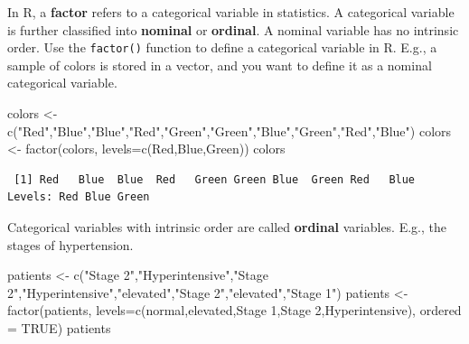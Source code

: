 \documentclass[
  letterpaper,
  DIV=11,
  numbers=noendperiod]{scrreprt}
\newenvironment{Shaded}{\begin{snugshade}}{\end{snugshade}}
\newcommand{\AttributeTok}[1]{\textcolor[rgb]{0.40,0.45,0.13}{#1}}
\newcommand{\ConstantTok}[1]{\textcolor[rgb]{0.56,0.35,0.01}{#1}}
\newcommand{\FunctionTok}[1]{\textcolor[rgb]{0.28,0.35,0.67}{#1}}
\newcommand{\NormalTok}[1]{\textcolor[rgb]{0.00,0.23,0.31}{#1}}
\newcommand{\OtherTok}[1]{\textcolor[rgb]{0.00,0.23,0.31}{#1}}
\newcommand{\StringTok}[1]{\textcolor[rgb]{0.13,0.47,0.30}{#1}}
\begin{document}
In R, a \textbf{factor} refers to a categorical variable in statistics.
A categorical variable is further classified into \textbf{nominal} or
\textbf{ordinal}. A nominal variable has no intrinsic order. Use the
\texttt{factor()} function to define a categorical variable in R. E.g.,
a sample of colors is stored in a vector, and you want to define it as a
nominal categorical variable.

\begin{Shaded}
\begin{Highlighting}[]
\NormalTok{colors }\OtherTok{\textless{}{-}} \FunctionTok{c}\NormalTok{(}\StringTok{"Red"}\NormalTok{,}\StringTok{"Blue"}\NormalTok{,}\StringTok{"Blue"}\NormalTok{,}\StringTok{"Red"}\NormalTok{,}\StringTok{"Green"}\NormalTok{,}\StringTok{"Green"}\NormalTok{,}\StringTok{"Blue"}\NormalTok{,}\StringTok{"Green"}\NormalTok{,}\StringTok{"Red"}\NormalTok{,}\StringTok{"Blue"}\NormalTok{)}
\NormalTok{colors }\OtherTok{\textless{}{-}} \FunctionTok{factor}\NormalTok{(colors, }\AttributeTok{levels=}\FunctionTok{c}\NormalTok{(}\StringTok{\textquotesingle{}Red\textquotesingle{}}\NormalTok{,}\StringTok{\textquotesingle{}Blue\textquotesingle{}}\NormalTok{,}\StringTok{\textquotesingle{}Green\textquotesingle{}}\NormalTok{))}
\NormalTok{colors}
\end{Highlighting}
\end{Shaded}

\begin{verbatim}
 [1] Red   Blue  Blue  Red   Green Green Blue  Green Red   Blue 
Levels: Red Blue Green
\end{verbatim}

Categorical variables with intrinsic order are called \textbf{ordinal}
variables. E.g., the stages of hypertension.

\begin{Shaded}
\begin{Highlighting}[]
\NormalTok{patients }\OtherTok{\textless{}{-}} \FunctionTok{c}\NormalTok{(}\StringTok{"Stage 2"}\NormalTok{,}\StringTok{"Hyperintensive"}\NormalTok{,}\StringTok{"Stage 2"}\NormalTok{,}\StringTok{"Hyperintensive"}\NormalTok{,}\StringTok{"elevated"}\NormalTok{,}\StringTok{"Stage 2"}\NormalTok{,}\StringTok{"elevated"}\NormalTok{,}\StringTok{"Stage 1"}\NormalTok{)}
\NormalTok{patients }\OtherTok{\textless{}{-}} \FunctionTok{factor}\NormalTok{(patients,}
                   \AttributeTok{levels=}\FunctionTok{c}\NormalTok{(}\StringTok{\textquotesingle{}normal\textquotesingle{}}\NormalTok{,}\StringTok{\textquotesingle{}elevated\textquotesingle{}}\NormalTok{,}\StringTok{\textquotesingle{}Stage 1\textquotesingle{}}\NormalTok{,}\StringTok{\textquotesingle{}Stage 2\textquotesingle{}}\NormalTok{,}\StringTok{\textquotesingle{}Hyperintensive\textquotesingle{}}\NormalTok{),}
                   \AttributeTok{ordered =} \ConstantTok{TRUE}\NormalTok{)}
\NormalTok{patients}
\end{Highlighting}
\end{Shaded}
\end{document}
